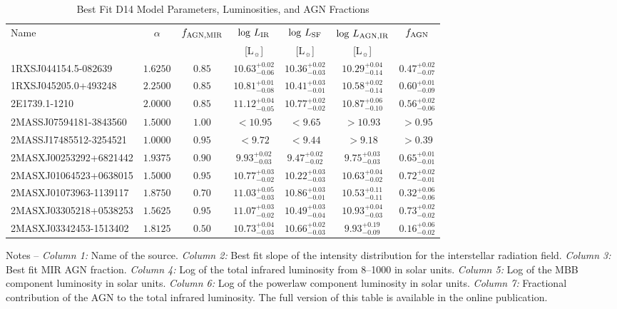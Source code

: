 \documentclass[fleqn, usenatbib]{mnras}
\newcommand{\lsun}{L$_{\sun}$}
\begin{document}
\begin{table}
\centering
\begin{threeparttable}
\captionsetup{font=small,labelfont=bf,labelsep=period}
\caption{Best Fit D14 Model Parameters, Luminosities, and AGN Fractions \label{tab:d14_params}}
\begin{tabular}{lcccccc}
\toprule 
Name & $\alpha$ & $f_{\rm AGN, MIR}$ & $\log\,L_{\rm IR}$ & $\log\,L_{\rm SF}$ & $\log\,L_{\rm AGN, IR}$ & $f_{\rm AGN}$ \\
 &  &  & [\lsun] & [\lsun] & [\lsun] & \\
\midrule
1RXSJ044154.5-082639 & $1.6250$ & $0.85$ & $10.63_{-0.06}^{+0.02}$ & $10.36_{-0.03}^{+0.02}$ & $10.29_{-0.14}^{+0.04}$ &$0.47_{-0.07}^{+0.02}$ \\
1RXSJ045205.0+493248 & $2.2500$ & $0.85$ & $10.81_{-0.08}^{+0.01}$ & $10.41_{-0.01}^{+0.03}$ & $10.58_{-0.14}^{+0.02}$ &$0.60_{-0.09}^{+0.01}$ \\
2E1739.1-1210 & $2.0000$ & $0.85$ & $11.12_{-0.05}^{+0.04}$ & $10.77_{-0.02}^{+0.02}$ & $10.87_{-0.10}^{+0.06}$ &$0.56_{-0.06}^{+0.02}$ \\
2MASSJ07594181-3843560 & $1.5000$ & $1.00$ & $<10.95$ & $<9.65$ & $>10.93$ &$>0.95$ \\
2MASSJ17485512-3254521 & $1.0000$ & $0.95$ & $<9.72$ & $<9.44$ & $>9.18$ &$>0.39$ \\
2MASXJ00253292+6821442 & $1.9375$ & $0.90$ & $9.93_{-0.03}^{+0.02}$ & $9.47_{-0.02}^{+0.02}$ & $9.75_{-0.03}^{+0.03}$ &$0.65_{-0.01}^{+0.01}$ \\
2MASXJ01064523+0638015 & $1.5000$ & $0.95$ & $10.77_{-0.02}^{+0.03}$ & $10.22_{-0.03}^{+0.03}$ & $10.63_{-0.02}^{+0.04}$ &$0.72_{-0.01}^{+0.02}$ \\
2MASXJ01073963-1139117 & $1.8750$ & $0.70$ & $11.03_{-0.03}^{+0.05}$ & $10.86_{-0.01}^{+0.03}$ & $10.53_{-0.11}^{+0.11}$ &$0.32_{-0.06}^{+0.06}$ \\
2MASXJ03305218+0538253 & $1.5625$ & $0.95$ & $11.07_{-0.02}^{+0.03}$ & $10.49_{-0.04}^{+0.03}$ & $10.93_{-0.03}^{+0.04}$ &$0.73_{-0.02}^{+0.02}$ \\
2MASXJ03342453-1513402 & $1.8125$ & $0.50$ & $10.73_{-0.03}^{+0.04}$ & $10.66_{-0.03}^{+0.02}$ & $9.93_{-0.09}^{+0.19}$ &$0.16_{-0.02}^{+0.06}$ \\
\bottomrule
\end{tabular}
\begin{tablenotes}
\item Notes -- \textit{Column 1:} Name of the source. \textit{Column 2:} Best fit slope of the intensity distribution for the interstellar radiation field. \textit{Column 3:}  Best fit MIR AGN fraction. \textit{Column 4:} Log of the total infrared luminosity from 8--1000 \micron{} in solar units. \textit{Column 5:} Log of the MBB component luminosity in solar units. \textit{Column 6:} Log of the powerlaw component luminosity in solar units. \textit{Column 7:} Fractional contribution of the AGN to the total infrared luminosity. The full version of this table is available in the online publication.\end{tablenotes}
\end{threeparttable}
\end{table}



\bsp	%
\label{lastpage}
\end{document}
